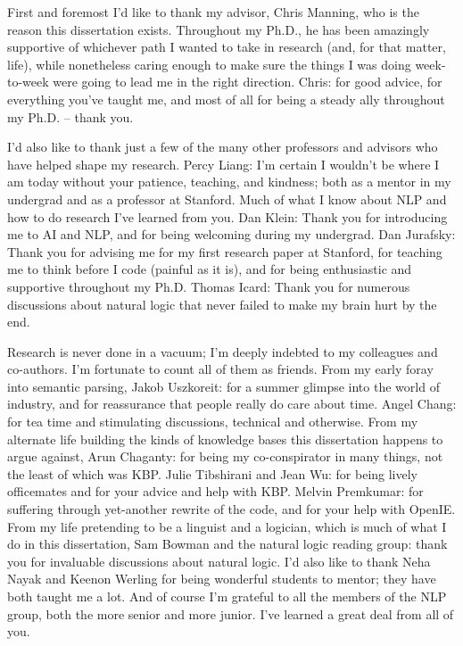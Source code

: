 
First and foremost I'd like to thank my advisor, Chris Manning, who is the reason this dissertation
  exists.
Throughout my Ph.D., he has been amazingly supportive of whichever path I wanted to take
  in research (and, for that matter, life), while nonetheless caring enough to make sure the things
  I was doing week-to-week were going to lead me in the right direction.
Chris: for good advice, for everything you've taught me, and most of all for being a steady ally
  throughout my Ph.D. -- thank you.

I'd also like to thank just a few of the many other professors and advisors who have 
  helped shape my research.
Percy Liang: I'm certain I wouldn't be where I am today without your patience, teaching, and kindness; both
  as a mentor in my undergrad and as a professor at Stanford.
Much of what I know about NLP and how to do research I've learned from you.
Dan Klein: Thank you for introducing me to AI and NLP, and for being welcoming during my undergrad.
Dan Jurafsky: Thank you for advising me for my first research paper at Stanford, for teaching me
  to think before I code (painful as it is), and for being enthusiastic and supportive throughout
  my Ph.D.
Thomas Icard: Thank you for numerous discussions about natural logic that never failed to make
  my brain hurt by the end.

Research is never done in a vacuum; I'm deeply indebted to my colleagues and co-authors.
I'm fortunate to count all of them as friends.
From my early foray into semantic parsing,
  Jakob Uszkoreit: for a summer glimpse into the world of industry, and for reassurance
  that people really do care about time.
Angel Chang: for tea time and stimulating discussions, technical
  and otherwise.
From my alternate life building the kinds of knowledge bases this dissertation happens
  to argue against,
Arun Chaganty: for being my co-conspirator in many things, not the least of which was KBP.
Julie Tibshirani and Jean Wu: for being lively officemates and for your advice and help with KBP.
Melvin Premkumar: for suffering through yet-another rewrite of the code, and for
  your help with OpenIE.
From my life pretending to be a linguist and a logician, which is much of what I do in this
  dissertation,
Sam Bowman and the natural logic reading group: thank you for invaluable discussions about natural logic.
I'd also like to thank Neha Nayak and Keenon Werling for being wonderful students to mentor;
  they have both taught me a lot.
And of course I'm grateful to all the members of the NLP group, both the more senior and more junior.
I've learned a great deal from all of you.

